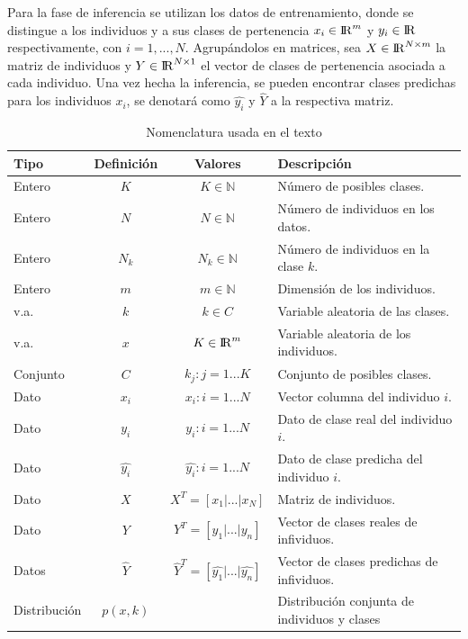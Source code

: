Para la fase de inferencia se utilizan los datos de entrenamiento, donde se distingue a los individuos y a sus clases de pertenencia $x_i \in  {\rm I\!R}^{m}$ y $y_i \in {\rm I\!R}$ respectivamente, con $i = 1, ... , N$. Agrupándolos en matrices, sea $X \in {\rm I\!R}^{N \times m}$ la matriz de individuos y $Y \in {\rm I\!R}^{N \times 1}$ el vector de clases de pertenencia asociada a cada individuo. Una vez hecha la inferencia, se pueden encontrar clases predichas para los individuos $x_i$, se denotará como $\widehat{y_i}$ y $\widehat{Y}$ a la respectiva matriz.


\begin{table}
\caption{Nomenclatura usada en el texto}
\begin{center}
    \begin{tabular}{ | l | c | c | p{4.5cm} |}
    \hline
    Tipo & Definición & Valores & Descripción  \\ \hline
    Entero & $K$ & $K \in \mathbb{N}$ & Número de posibles clases. \\ \hline
    Entero & $N$ & $N \in \mathbb{N}$ & Número de individuos en los datos. \\ \hline
    Entero & $N_k$ & $N_k \in \mathbb{N}$ & Número de individuos en la clase $k$. \\ \hline
    Entero & $m$ & $m \in \mathbb{N}$ & Dimensión de los individuos. \\ \hline
    v.a. & $k$ & $k \in C$ & Variable aleatoria de las clases. \\ \hline
	v.a. & $x$ & $K \in {\rm I\!R}^{m}$ & Variable aleatoria de los individuos. \\ \hline
    Conjunto & $C$ & $k_j: j = 1 ... K$ & Conjunto de posibles clases. \\ \hline
    Dato & $x_i$ & $x_i: i = 1 ... N$ & Vector columna del individuo $i$. \\ \hline
    Dato & $y_i$ & $y_i: i = 1 ... N$ & Dato de clase real del individuo $i$. \\ \hline
    Dato & $\widehat{y_i}$ & $\widehat{y_i}: i = 1 ... N$ & Dato de clase predicha del individuo $i$. \\ \hline
    Dato & $X$ & $X^T = [x_1 |...| x_N]$ & Matriz de individuos. \\ \hline
    Dato & $Y$ & $Y^T = [y_1 | ... | y_n]$ & Vector de clases reales de infividuos. \\ \hline
    Datos & $\widehat{Y}$ & $\widehat{Y}^T = [\widehat{y_1} | ... | \widehat{y_n}]$ & Vector de clases predichas de infividuos. \\ \hline
    Distribución & $p(x,k) $ &  & Distribución conjunta de individuos y clases \\ \hline
    \end{tabular}
\end{center}
\end{table}


